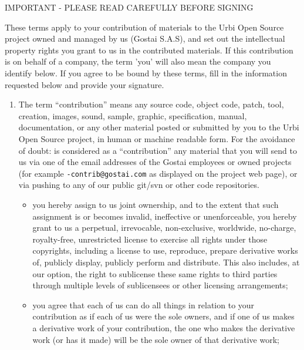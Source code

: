 \begin{center}
  IMPORTANT - PLEASE READ CAREFULLY BEFORE SIGNING
\end{center}

These terms apply to your contribution of materials to the Urbi Open Source
project owned and managed by us (Gostai S.A.S), and set out the intellectual
property rights you grant to us in the contributed materials. If this
contribution is on behalf of a company, the term 'you' will also mean the
company you identify below. If you agree to be bound by these terms, fill in
the information requested below and provide your signature.

\begin{enumerate}
\item The term ``contribution'' means any source code, object code, patch,
  tool, creation, images, sound, sample, graphic, specification, manual,
  documentation, or any other material posted or submitted by you to the
  Urbi Open Source project, in human or machine readable form. For the
  avoidance of doubt: is considered as a ``contribution'' any material that
  you will send to us via one of the email addresses of the Gostai employees
  or owned projects (for example \texttt{-contrib@gostai.com}
  as displayed on the project web page), or via pushing to any of our public
  git/svn or other code repositories.

  \begin{itemize}
  \item you hereby assign to us joint ownership, and to the extent that such
    assignment is or becomes invalid, ineffective or unenforceable, you
    hereby grant to us a perpetual, irrevocable, non-exclusive, worldwide,
    no-charge, royalty-free, unrestricted license to exercise all rights
    under those copyrights, including a license to use, reproduce, prepare
    derivative works of, publicly display, publicly perform and
    distribute. This also includes, at our option, the right to sublicense
    these same rights to third parties through multiple levels of
    sublicensees or other licensing arrangements;

  \item you agree that each of us can do all things in relation to your
    contribution as if each of us were the sole owners, and if one of us
    makes a derivative work of your contribution, the one who makes the
    derivative work (or has it made) will be the sole owner of that
    derivative work;


\end{itemize}
\end{enumerate}
